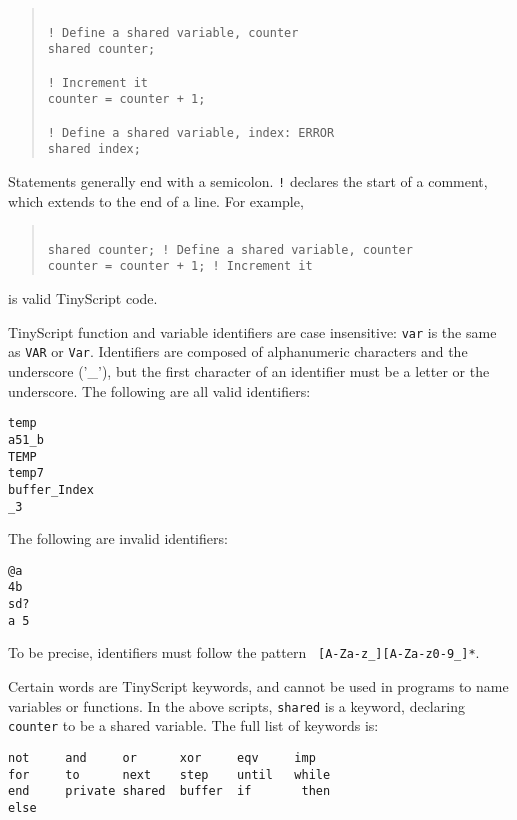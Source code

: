 \documentclass[12pt]{article}
\begin{document}
\begin{quotation}
\begin{verbatim}

! Define a shared variable, counter
shared counter;

! Increment it
counter = counter + 1;

! Define a shared variable, index: ERROR
shared index;

\end{verbatim}
\end{quotation}

Statements generally end with a semicolon. {\tt !} declares the start
of a comment, which extends to the end of a line. For example,

\begin{quotation}
\begin{verbatim}

shared counter; ! Define a shared variable, counter
counter = counter + 1; ! Increment it

\end{verbatim}
\end{quotation}

is valid TinyScript code.

TinyScript function and variable identifiers are case insensitive:
{\tt var} is the same as {\tt VAR} or {\tt Var}. Identifiers are
composed of alphanumeric characters and the underscore ('\_'), but the
first character of an identifier must be a letter or the
underscore. The following are all valid identifiers:

\begin{verbatim}
temp
a51_b
TEMP
temp7
buffer_Index
_3
\end{verbatim}

The following are invalid identifiers:


\begin{verbatim}
@a
4b
sd?
a 5
\end{verbatim}


To be precise, identifiers must follow the pattern {\tt
[A-Za-z\_][A-Za-z0-9\_]*}.

Certain words are TinyScript keywords, and cannot be used in programs
to name variables or functions. In the above scripts, {\tt shared} is
a keyword, declaring {\tt counter} to be a shared variable. The full
list of keywords is:

\begin{verbatim}
not     and     or      xor     eqv     imp
for     to      next    step    until   while
end     private shared  buffer  if       then
else
\end{verbatim}
\end{document}
